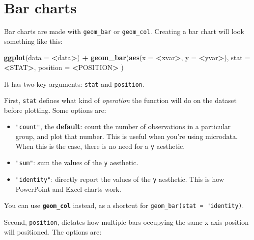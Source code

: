\documentclass[
]{book}
\newenvironment{Shaded}{\begin{snugshade}}{\end{snugshade}}
\newcommand{\DataTypeTok}[1]{\textcolor[rgb]{0.13,0.29,0.53}{#1}}
\newcommand{\KeywordTok}[1]{\textcolor[rgb]{0.13,0.29,0.53}{\textbf{#1}}}
\newcommand{\NormalTok}[1]{#1}
\newcommand{\OperatorTok}[1]{\textcolor[rgb]{0.81,0.36,0.00}{\textbf{#1}}}
\newcommand{\StringTok}[1]{\textcolor[rgb]{0.31,0.60,0.02}{#1}}
\providecommand{\tightlist}{%
  \setlength{\itemsep}{0pt}\setlength{\parskip}{0pt}}
\begin{document}
\hypertarget{bar-charts}{%
\section{Bar charts}\label{bar-charts}}

Bar charts are made with \texttt{geom\_bar} or \texttt{geom\_col}. Creating a bar chart will look something like this:

\begin{Shaded}
\begin{Highlighting}[]
\KeywordTok{ggplot}\NormalTok{(}\DataTypeTok{data =} \OperatorTok{\textless{}}\NormalTok{data}\OperatorTok{\textgreater{}}\NormalTok{) }\OperatorTok{+}\StringTok{ }
\StringTok{  }\KeywordTok{geom\_bar}\NormalTok{(}\KeywordTok{aes}\NormalTok{(}\DataTypeTok{x =} \OperatorTok{\textless{}}\NormalTok{xvar}\OperatorTok{\textgreater{}}\NormalTok{, }\DataTypeTok{y =} \OperatorTok{\textless{}}\NormalTok{yvar}\OperatorTok{\textgreater{}}\NormalTok{),}
     \DataTypeTok{stat =} \OperatorTok{\textless{}}\NormalTok{STAT}\OperatorTok{\textgreater{}}\NormalTok{, }
     \DataTypeTok{position =} \OperatorTok{\textless{}}\NormalTok{POSITION}\OperatorTok{\textgreater{}}
\StringTok{  }\NormalTok{)}
\end{Highlighting}
\end{Shaded}

It has two key arguments: \texttt{stat} and \texttt{position}.

First, \texttt{stat} defines what kind of \emph{operation} the function will do on the dataset before plotting. Some options are:

\begin{itemize}
\tightlist
\item
  \texttt{"count"}, the \textbf{default}: count the number of observations in a particular group, and plot that number. This is useful when you're using microdata. When this is the case, there is no need for a \texttt{y} aesthetic.
\item
  \texttt{"sum"}: sum the values of the \texttt{y} aesthetic.
\item
  \texttt{"identity"}: directly report the values of the \texttt{y} aesthetic. This is how PowerPoint and Excel charts work.
\end{itemize}

You can use \textbf{\texttt{geom\_col}} instead, as a shortcut for \texttt{geom\_bar(stat\ =\ "identity)}.

Second, \texttt{position}, dictates how multiple bars occupying the same x-axis position will positioned. The options are:
\end{document}
